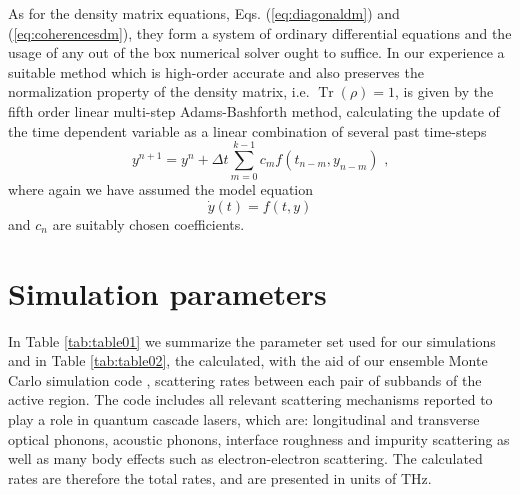 \documentclass[10pt,letterpaper]{article}
\DeclareMathOperator{\Tr}{Tr}
\begin{document}
{\begin{appendices}
As for the density matrix equations, Eqs. (\ref{eq:diagonaldm}) and (\ref{eq:coherencesdm}), they form a system of ordinary differential equations and the usage of any out of the box numerical solver ought to suffice. In our experience a suitable method which is high-order accurate and also preserves the normalization property of the density matrix, i.e. $\Tr(\rho) = 1$, is given by the fifth order linear multi-step Adams-Bashforth method, calculating the update of the time dependent variable as a linear combination of several past time-steps
\begin{equation}
\label{eq:adams-bashforth}
y^{n+1} = y^{n} + \Delta t \sum\limits_{m = 0}^{k-1} c_m f(t_{n-m},y_{n-m}) \text{	,}
\end{equation}
where again we have assumed the model equation
\begin{equation}
\label{eq:adams-bashforth-model}
\dot{y}(t) =f(t,y)
\end{equation}
and $c_n$ are suitably chosen coefficients. 

\section{Simulation parameters}
\label{sec:params}
In Table \ref{tab:table01} we summarize the parameter set used for our simulations and in Table \ref{tab:table02}, the calculated, with the aid of our ensemble Monte Carlo simulation code \cite{jirauschek2014modeling}, scattering rates between each pair of subbands of the active region. The code includes all relevant scattering mechanisms reported to play a role in quantum cascade lasers, which are: longitudinal and transverse optical phonons, acoustic phonons, interface roughness and impurity scattering as well as many body effects such as electron-electron scattering. The calculated rates are therefore the total rates, and are presented in units of THz.


\end{appendices}}
\end{document}
